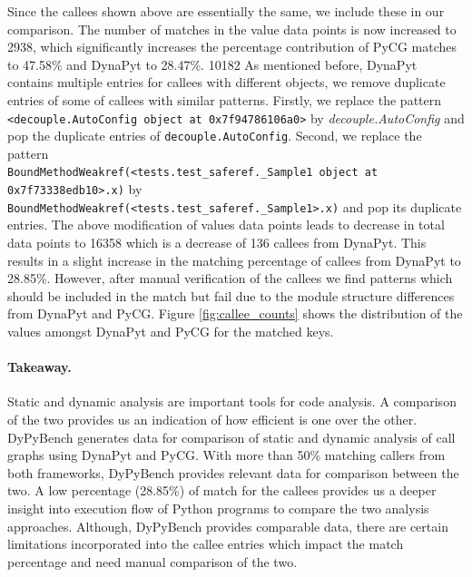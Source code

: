 Since the callees shown above are essentially the same, we include these in our comparison.
The number of matches in the value data points is now increased to 2938, which significantly increases the percentage contribution of PyCG matches to 47.58\% and DynaPyt to 28.47\%. 10182
As mentioned before, DynaPyt contains multiple entries for callees with different objects, we remove duplicate entries of some of callees with similar patterns.
Firstly, we replace the pattern \verb|<decouple.AutoConfig object at 0x7f94786106a0>| by \textit{decouple.AutoConfig} and pop the duplicate entries of \verb|decouple.AutoConfig|.
Second, we replace the pattern \\\verb|BoundMethodWeakref(<tests.test_saferef._Sample1 object at 0x7f73338edb10>.x)| by \\\verb|BoundMethodWeakref(<tests.test_saferef._Sample1>.x)| and pop its duplicate entries.
The above modification of values data points leads to decrease in total data points to 16358 which is a decrease of 136 callees from DynaPyt.
This results in a slight increase in the matching percentage of callees from DynaPyt to 28.85\%.
However, after manual verification of the callees we find patterns which should be included in the match but fail due to the module structure differences from DynaPyt and PyCG.
Figure \ref{fig:callee_counts} shows the distribution of the values amongst DynaPyt and PyCG for the matched keys.

\paragraph{Takeaway.} Static and dynamic analysis are important tools for code analysis.
A comparison of the two provides us an indication of how efficient is one over the other.
DyPyBench generates data for comparison of static and dynamic analysis of call graphs using DynaPyt and PyCG.
With more than 50\% matching callers from both frameworks, DyPyBench provides relevant data for comparison between the two.
A low percentage (28.85\%) of match for the callees provides us a deeper insight into execution flow of Python programs to compare the two analysis approaches.
Although, DyPyBench provides comparable data, there are certain limitations incorporated into the callee entries which impact the match percentage and need manual comparison of the two.
